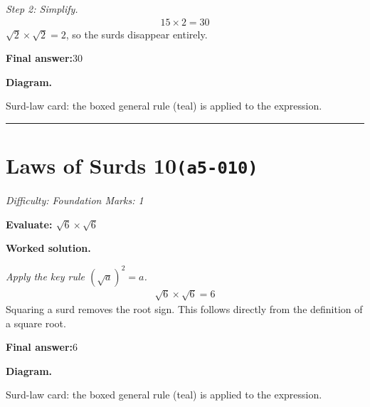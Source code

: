\documentclass[11pt]{article}
\newcommand{\question}[1]{\par\medskip\noindent\textbf{#1}\par}
\begin{document}
\textit{Step 2: Simplify.}
\[\begin{gathered}
15 \times 2 = 30
\end{gathered}\]
\( \sqrt{2} \times \sqrt{2} = 2 \), so the surds disappear entirely.

\begin{answerbox}
\textbf{Final answer:}\quad \(\displaystyle 30\)
\end{answerbox}
\textbf{Diagram.}

\begin{center}
\end{center}
\small Surd-law card: the boxed general rule (teal) is applied to the expression.\normalsize

\medskip\hrule

\section*{Laws of Surds 10\quad\small\texttt{(a5-010)}}
\textit{Difficulty: Foundation \quad\textbar\quad Marks: 1}

\question{Evaluate: \( \sqrt{6} \times \sqrt{6} \)}

\textbf{Worked solution.}

\textit{Apply the key rule \( (\sqrt{a})^2 = a \).}
\[\begin{gathered}
\sqrt{6} \times \sqrt{6} = 6
\end{gathered}\]
Squaring a surd removes the root sign. This follows directly from the definition of a square root.

\begin{answerbox}
\textbf{Final answer:}\quad \(\displaystyle 6\)
\end{answerbox}
\textbf{Diagram.}

\begin{center}
\end{center}
\small Surd-law card: the boxed general rule (teal) is applied to the expression.\normalsize
\end{document}

